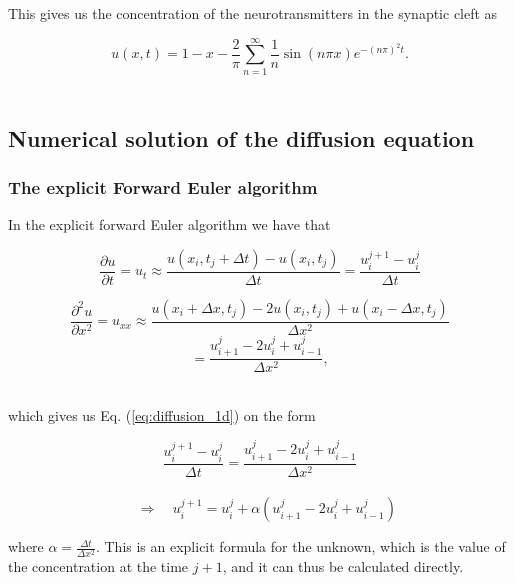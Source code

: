 \documentclass[12pt]{article}
\begin{document}
\begin{flushleft}
This gives us the concentration of the neurotransmitters in the synaptic cleft as

\vspace{5mm}
$$u(x,t) =   1 - x-\frac{2}{\pi}\sum\limits_{n=1}^{\infty} \frac{1}{n}\sin\left(n\pi x\right)e^{-(n\pi)^2t}.$$\\
\vspace{5mm}



\subsection{Numerical solution of the diffusion equation}
\subsubsection{The explicit Forward Euler algorithm}
In the explicit forward Euler algorithm we have that
 
\vspace{5mm}
\begin{equation}\label{eq:forwrd_Euler_time}
\frac{\partial u}{\partial t} = u_t\approx \frac{u(x_i,t_j+\Delta t)-u(x_i,t_j)}{\Delta t} = \frac{u_i^{j+1}-u_i^j}{\Delta t} 
\end{equation}

\vspace{5mm}
\begin{equation}\label{eq:forwrd_Euler_space}
\frac{\partial^2 u}{\partial x^2} =u_{xx}\approx \frac{u(x_i+\Delta x,t_j)-2u(x_i,t_j)+u(x_i-\Delta x,t_j)}{\Delta x^2}
\end{equation}
\vspace{5mm}
$$ = \frac{u_{i+1}^j-2u_i^j+u_{i-1}^j}{\Delta x^2},$$\\
\vspace{5mm}

which gives us Eq. (\ref{eq:diffusion_1d}) on the form

\vspace{5mm}
$$\frac{u_i^{j+1}-u_i^j}{\Delta t} = \frac{u_{i+1}^j-2u_i^j+u_{i-1}^j}{\Delta x^2}$$\\
\vspace{5mm}
\begin{equation}\label{eq:explicit_Euler_unknown}
\quad\Rightarrow\quad u_i^{j+1} = u_i^j + \alpha\left(u_{i+1}^j -2u_i^j+u_{i-1}^j\right)
\end{equation}
\vspace{5mm}

where $\alpha = \frac{\Delta t}{\Delta x^2}$. This is an explicit formula for the unknown, which is the value of the concentration at the time $j+1$, and it can thus be calculated directly.


\end{flushleft}
\end{document}
